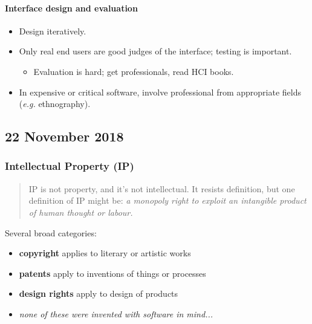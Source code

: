 \documentclass[a4paper]{article}
\providecommand{\tightlist}{%
  \setlength{\itemsep}{0pt}\setlength{\parskip}{0pt}}
\let\oldparagraph\paragraph
\renewcommand{\paragraph}[1]{\oldparagraph{#1}\mbox{}}
\begin{document}
\hypertarget{interface-design-and-evaluation}{%
\paragraph{Interface design and
evaluation}\label{interface-design-and-evaluation}}

\begin{itemize}
\tightlist
\item
  Design iteratively.
\item
  Only real end users are good judges of the interface; testing is
  important.

  \begin{itemize}
  \tightlist
  \item
    Evaluation is hard; get professionals, read HCI books.
  \end{itemize}
\item
  In expensive or critical software, involve professional from
  appropriate fields (\emph{e.g.} ethnography).
\end{itemize}

\hypertarget{22-november-2018}{%
\subsection{22 November 2018}\label{22-november-2018}}

\hypertarget{intellectual-property-ip}{%
\subsubsection{Intellectual Property
(IP)}\label{intellectual-property-ip}}

\begin{quote}
IP is not property, and it's not intellectual. It resists definition,
but one definition of IP might be: \emph{a monopoly right to exploit an
intangible product of human thought or labour.}
\end{quote}

Several broad categories:

\begin{itemize}
\tightlist
\item
  \textbf{copyright} applies to literary or artistic works
\item
  \textbf{patents} apply to inventions of things or processes
\item
  \textbf{design rights} apply to design of products
\item
  \emph{none of these were invented with software in mind...}
\end{itemize}
\end{document}
